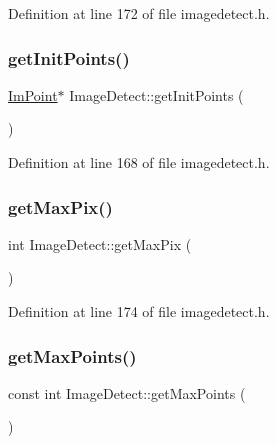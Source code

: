 Definition at line 172 of file imagedetect.\+h.

\mbox{\label{class_image_detect_ade0368fed2ea4cccbbc436eb651603a5}} 
\subsubsection{\texorpdfstring{getInitPoints()}{getInitPoints()}}
{\footnotesize\ttfamily \mbox{\hyperlink{struct_im_point}{Im\+Point}}$\ast$ Image\+Detect\+::get\+Init\+Points (\begin{DoxyParamCaption}{ }\end{DoxyParamCaption})\hspace{0.3cm}{\ttfamily [inline]}}



Definition at line 168 of file imagedetect.\+h.

\mbox{\label{class_image_detect_acd993d239569845c322f5956c7370911}} 
\subsubsection{\texorpdfstring{getMaxPix()}{getMaxPix()}}
{\footnotesize\ttfamily int Image\+Detect\+::get\+Max\+Pix (\begin{DoxyParamCaption}{ }\end{DoxyParamCaption})\hspace{0.3cm}{\ttfamily [inline]}}



Definition at line 174 of file imagedetect.\+h.

\mbox{\label{class_image_detect_a0df3a01d26a8fbf8383f5980f430ba03}} 
\subsubsection{\texorpdfstring{getMaxPoints()}{getMaxPoints()}}
{\footnotesize\ttfamily const int Image\+Detect\+::get\+Max\+Points (\begin{DoxyParamCaption}{ }\end{DoxyParamCaption})\hspace{0.3cm}{\ttfamily [inline]}}



